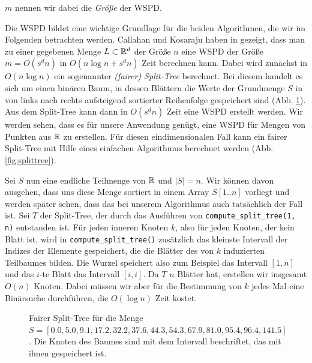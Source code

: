 \noindent $m$ nennen wir dabei die \emph{Größe} der WSPD.

Die WSPD bildet eine wichtige Grundlage für die beiden Algorithmen, die wir im Folgenden betrachten werden. 
Callahan und Kosaraju haben in \cite{callahan} gezeigt, dass man zu einer gegebenen Menge $L \subset \mathbb{R}^d$ der Größe $n$ eine WSPD  der Größe $m = O(s^dn)$ in $O(n\log n + s^dn)$ Zeit berechnen kann. 
Dabei wird zunächst in $O(n \log n)$ ein sogenannter \emph{(fairer) Split-Tree} berechnet. 
Bei diesem handelt es sich um einen binären Baum, in dessen Blättern die Werte der Grundmenge $S$ in von links nach rechts aufsteigend sortierter Reihenfolge gespeichert sind (Abb. \ref{fig:splittreeex}). 
Aus dem Split-Tree kann dann in $O(s^dn)$ Zeit eine WSPD erstellt werden. 
Wir werden sehen, dass es für unsere Anwendung genügt, eine WSPD für Mengen von Punkten aus $\mathbb{R}$ zu erstellen. 
Für diesen eindimensionalen Fall kann ein fairer Split-Tree mit Hilfe eines einfachen Algorithmus berechnet werden (Abb. \ref{fig:splittree}).



Sei $S$ nun eine endliche Teilmenge von $\mathbb{R}$ und $|S| = n$. 
Wir können davon ausgehen, dass uns diese Menge sortiert in einem Array $S[1..n]$ vorliegt und werden später sehen, dass das bei unserem Algorithmus auch tatsächlich der Fall ist. 
Sei $T$ der Split-Tree, der durch das Ausführen von \texttt{compute\_split\_tree(1, n)} entstanden ist.
Für jeden inneren Knoten $k$, also für jeden Knoten, der kein Blatt ist, wird in \texttt{compute\_split\_tree()} zusätzlich das kleinste Intervall der Indizes der Elemente gespeichert, die die Blätter des von $k$ induzierten Teilbaumes bilden.
Die Wurzel speichert also zum Beispiel das Intervall $[1, n]$ und das $i$-te Blatt das Intervall $[i, i]$.
Da $T$ $n$ Blätter hat, erstellen wir insgesamt $O(n)$ Knoten. 
Dabei müssen wir aber für die Bestimmung von $k$ jedes Mal eine Binärsuche durchführen, die $O(\log n)$ Zeit kostet. 

\begin{figure}
   	\caption{Fairer Split-Tree für die Menge $S=[0.0, 5.0, 9.1, 17.2, 32.2, 37.6, 44.3, 54.3, 67.9, 81.0, 95.4, 96.4, 141.5]$. Die Knoten des Baumes sind mit dem Intervall beschriftet, das mit ihnen gespeichert ist.}
   	\label{fig:splittreeex}
\end{figure}

